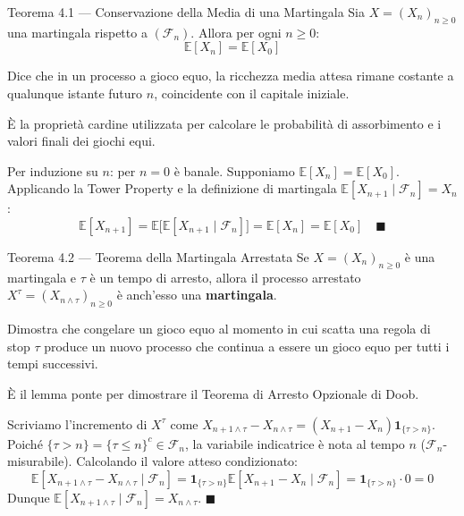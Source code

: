 \documentclass[11pt,a4paper]{report}
\newcommand{\E}{\mathbb{E}}
\newcommand{\F}{\mathcal{F}}
\newcommand{\1}{\mathbf{1}}
\begin{document}
\vspace{0.4cm}

\begin{teoremabox}{Teorema 4.1 --- Conservazione della Media di una Martingala}
Sia $X = (X_n)_{n \ge 0}$ una martingala rispetto a $(\F_n)$. Allora per ogni $n \ge 0$:
\[ \E[X_n] = \E[X_0] \]
\end{teoremabox}

\begin{cosafa}
Dice che in un processo a gioco equo, la ricchezza media attesa rimane costante a qualunque istante futuro $n$, coincidente con il capitale iniziale.
\end{cosafa}

\begin{acosaserve}
È la proprietà cardine utilizzata per calcolare le probabilità di assorbimento e i valori finali dei giochi equi.
\end{acosaserve}

\begin{dimostrazione}
Per induzione su $n$: per $n=0$ è banale. Supponiamo $\E[X_n] = \E[X_0]$.  
Applicando la Tower Property e la definizione di martingala $\E[X_{n+1} \mid \F_n] = X_n$:
\[ \E[X_{n+1}] = \E\big[\E[X_{n+1} \mid \F_n]\big] = \E[X_n] = \E[X_0] \quad \blacksquare \]
\end{dimostrazione}

\vspace{0.4cm}

\begin{teoremabox}{Teorema 4.2 --- Teorema della Martingala Arrestata}
Se $X = (X_n)_{n \ge 0}$ è una martingala e $\tau$ è un tempo di arresto, allora il processo arrestato $X^\tau = (X_{n \wedge \tau})_{n \ge 0}$ è anch'esso una \textbf{martingala}.
\end{teoremabox}

\begin{cosafa}
Dimostra che congelare un gioco equo al momento in cui scatta una regola di stop $\tau$ produce un nuovo processo che continua a essere un gioco equo per tutti i tempi successivi.
\end{cosafa}

\begin{acosaserve}
È il lemma ponte per dimostrare il Teorema di Arresto Opzionale di Doob.
\end{acosaserve}

\begin{dimostrazione}
Scriviamo l'incremento di $X^\tau$ come $X_{n+1 \wedge \tau} - X_{n \wedge \tau} = (X_{n+1} - X_n) \1_{\{\tau > n\}}$.  
Poiché $\{\tau > n\} = \{\tau \le n\}^c \in \F_n$, la variabile indicatrice è nota al tempo $n$ ($\F_n$-misurabile).  
Calcolando il valore atteso condizionato:
\[ \E[X_{n+1 \wedge \tau} - X_{n \wedge \tau} \mid \F_n] = \1_{\{\tau > n\}} \E[X_{n+1} - X_n \mid \F_n] = \1_{\{\tau > n\}} \cdot 0 = 0 \]
Dunque $\E[X_{n+1 \wedge \tau} \mid \F_n] = X_{n \wedge \tau}$. $\blacksquare$
\end{dimostrazione}
\end{document}
